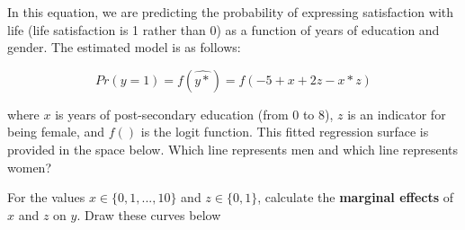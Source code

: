 \documentclass[a4paper,12pt]{article}
\begin{document}
In this equation, we are predicting the probability of expressing satisfaction with life (life satisfaction is 1 rather than 0) as a function of years of education and gender. The estimated model is as follows:

\begin{equation}
Pr(y = 1) = f(\hat{y\ast}) = f(-5 + x + 2 z - x*z)
\end{equation}

\noindent where $x$ is years of post-secondary education (from 0 to 8), $z$ is an indicator for being female, and $f()$ is the logit function. This fitted regression surface is provided in the space below. Which line represents men and which line represents women?

\begin{center}
\end{center}

\noindent For the values $x \in \{0,1,...,10\}$ and $z \in \{0,1\}$, calculate the \textbf{marginal effects} of $x$ and $z$ on $y$. Draw these curves below

\begin{center}
\end{center}
\end{document}
